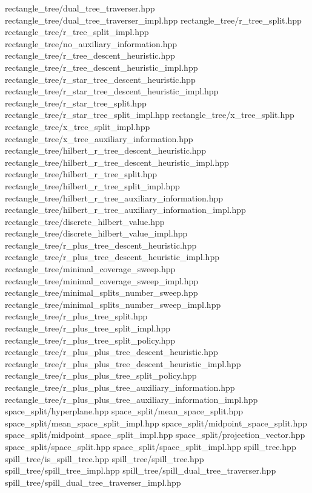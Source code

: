 {\begin{DoxyParamCaption}
rectangle\+\_\+tree/dual\+\_\+tree\+\_\+traverser.\+hpp rectangle\+\_\+tree/dual\+\_\+tree\+\_\+traverser\+\_\+impl.\+hpp rectangle\+\_\+tree/r\+\_\+tree\+\_\+split.\+hpp rectangle\+\_\+tree/r\+\_\+tree\+\_\+split\+\_\+impl.\+hpp rectangle\+\_\+tree/no\+\_\+auxiliary\+\_\+information.\+hpp rectangle\+\_\+tree/r\+\_\+tree\+\_\+descent\+\_\+heuristic.\+hpp rectangle\+\_\+tree/r\+\_\+tree\+\_\+descent\+\_\+heuristic\+\_\+impl.\+hpp rectangle\+\_\+tree/r\+\_\+star\+\_\+tree\+\_\+descent\+\_\+heuristic.\+hpp rectangle\+\_\+tree/r\+\_\+star\+\_\+tree\+\_\+descent\+\_\+heuristic\+\_\+impl.\+hpp rectangle\+\_\+tree/r\+\_\+star\+\_\+tree\+\_\+split.\+hpp rectangle\+\_\+tree/r\+\_\+star\+\_\+tree\+\_\+split\+\_\+impl.\+hpp rectangle\+\_\+tree/x\+\_\+tree\+\_\+split.\+hpp rectangle\+\_\+tree/x\+\_\+tree\+\_\+split\+\_\+impl.\+hpp rectangle\+\_\+tree/x\+\_\+tree\+\_\+auxiliary\+\_\+information.\+hpp rectangle\+\_\+tree/hilbert\+\_\+r\+\_\+tree\+\_\+descent\+\_\+heuristic.\+hpp rectangle\+\_\+tree/hilbert\+\_\+r\+\_\+tree\+\_\+descent\+\_\+heuristic\+\_\+impl.\+hpp rectangle\+\_\+tree/hilbert\+\_\+r\+\_\+tree\+\_\+split.\+hpp rectangle\+\_\+tree/hilbert\+\_\+r\+\_\+tree\+\_\+split\+\_\+impl.\+hpp rectangle\+\_\+tree/hilbert\+\_\+r\+\_\+tree\+\_\+auxiliary\+\_\+information.\+hpp rectangle\+\_\+tree/hilbert\+\_\+r\+\_\+tree\+\_\+auxiliary\+\_\+information\+\_\+impl.\+hpp rectangle\+\_\+tree/discrete\+\_\+hilbert\+\_\+value.\+hpp rectangle\+\_\+tree/discrete\+\_\+hilbert\+\_\+value\+\_\+impl.\+hpp rectangle\+\_\+tree/r\+\_\+plus\+\_\+tree\+\_\+descent\+\_\+heuristic.\+hpp rectangle\+\_\+tree/r\+\_\+plus\+\_\+tree\+\_\+descent\+\_\+heuristic\+\_\+impl.\+hpp rectangle\+\_\+tree/minimal\+\_\+coverage\+\_\+sweep.\+hpp rectangle\+\_\+tree/minimal\+\_\+coverage\+\_\+sweep\+\_\+impl.\+hpp rectangle\+\_\+tree/minimal\+\_\+splits\+\_\+number\+\_\+sweep.\+hpp rectangle\+\_\+tree/minimal\+\_\+splits\+\_\+number\+\_\+sweep\+\_\+impl.\+hpp rectangle\+\_\+tree/r\+\_\+plus\+\_\+tree\+\_\+split.\+hpp rectangle\+\_\+tree/r\+\_\+plus\+\_\+tree\+\_\+split\+\_\+impl.\+hpp rectangle\+\_\+tree/r\+\_\+plus\+\_\+tree\+\_\+split\+\_\+policy.\+hpp rectangle\+\_\+tree/r\+\_\+plus\+\_\+plus\+\_\+tree\+\_\+descent\+\_\+heuristic.\+hpp rectangle\+\_\+tree/r\+\_\+plus\+\_\+plus\+\_\+tree\+\_\+descent\+\_\+heuristic\+\_\+impl.\+hpp rectangle\+\_\+tree/r\+\_\+plus\+\_\+plus\+\_\+tree\+\_\+split\+\_\+policy.\+hpp rectangle\+\_\+tree/r\+\_\+plus\+\_\+plus\+\_\+tree\+\_\+auxiliary\+\_\+information.\+hpp rectangle\+\_\+tree/r\+\_\+plus\+\_\+plus\+\_\+tree\+\_\+auxiliary\+\_\+information\+\_\+impl.\+hpp space\+\_\+split/hyperplane.\+hpp space\+\_\+split/mean\+\_\+space\+\_\+split.\+hpp space\+\_\+split/mean\+\_\+space\+\_\+split\+\_\+impl.\+hpp space\+\_\+split/midpoint\+\_\+space\+\_\+split.\+hpp space\+\_\+split/midpoint\+\_\+space\+\_\+split\+\_\+impl.\+hpp space\+\_\+split/projection\+\_\+vector.\+hpp space\+\_\+split/space\+\_\+split.\+hpp space\+\_\+split/space\+\_\+split\+\_\+impl.\+hpp spill\+\_\+tree.\+hpp spill\+\_\+tree/is\+\_\+spill\+\_\+tree.\+hpp spill\+\_\+tree/spill\+\_\+tree.\+hpp spill\+\_\+tree/spill\+\_\+tree\+\_\+impl.\+hpp spill\+\_\+tree/spill\+\_\+dual\+\_\+tree\+\_\+traverser.\+hpp spill\+\_\+tree/spill\+\_\+dual\+\_\+tree\+\_\+traverser\+\_\+impl.\+hpp 
\end{DoxyParamCaption}}
